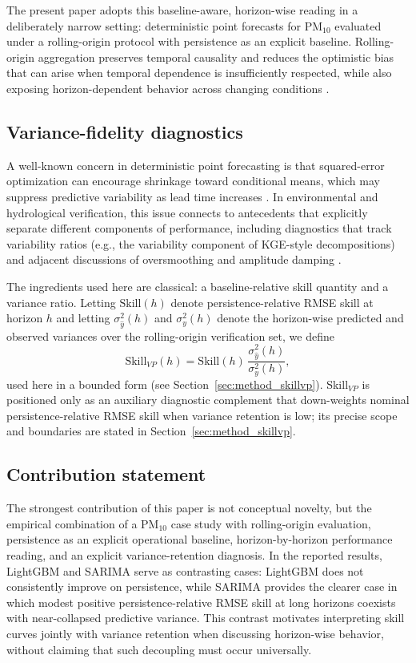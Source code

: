 \documentclass{article}
\begin{document}
The present paper adopts this baseline-aware, horizon-wise reading in a
deliberately narrow setting: deterministic point forecasts for PM$_{10}$
evaluated under a rolling-origin protocol with persistence as an explicit
baseline.
Rolling-origin aggregation preserves temporal causality and reduces the
optimistic bias that can arise when temporal dependence is insufficiently
respected, while also exposing horizon-dependent behavior across changing
conditions \citep{tashman2000}.

\subsection{Variance-fidelity diagnostics}

A well-known concern in deterministic point forecasting is that squared-error
optimization can encourage shrinkage toward conditional means, which may
suppress predictive variability as lead time increases \citep{gneiting2011}.
In environmental and hydrological verification, this issue connects to
antecedents that explicitly separate different components of performance,
including diagnostics that track variability ratios (e.g., the variability
component of KGE-style decompositions) and adjacent discussions of
oversmoothing and amplitude damping \citep{gupta2009,kling2012}.

The ingredients used here are classical: a baseline-relative skill quantity
and a variance ratio.
Letting $\mathrm{Skill}(h)$ denote persistence-relative RMSE skill at horizon
$h$ and letting $\sigma_{\hat{y}}^2(h)$ and $\sigma_y^2(h)$ denote the
horizon-wise predicted and observed variances over the rolling-origin
verification set, we define
\begin{equation}
  \mathrm{Skill}_{VP}(h) = \mathrm{Skill}(h)\,
  \frac{\sigma_{\hat{y}}^2(h)}{\sigma_y^2(h)},
\end{equation}
used here in a bounded form (see Section~\ref{sec:method_skillvp}).
Skill$_{VP}$ is positioned only as an auxiliary diagnostic complement that
down-weights nominal persistence-relative RMSE skill when variance retention
is low; its precise scope and boundaries are stated in
Section~\ref{sec:method_skillvp}.

\subsection{Contribution statement}

The strongest contribution of this paper is not conceptual novelty, but the
empirical combination of a PM$_{10}$ case study with rolling-origin evaluation,
persistence as an explicit operational baseline, horizon-by-horizon performance
reading, and an explicit variance-retention diagnosis.
In the reported results, LightGBM and SARIMA serve as contrasting cases:
LightGBM does not consistently improve on persistence, while SARIMA provides
the clearer case in which modest positive persistence-relative RMSE skill at
long horizons coexists with near-collapsed predictive variance.
This contrast motivates interpreting skill curves jointly with variance
retention when discussing horizon-wise behavior, without claiming that such
decoupling must occur universally.
\end{document}
